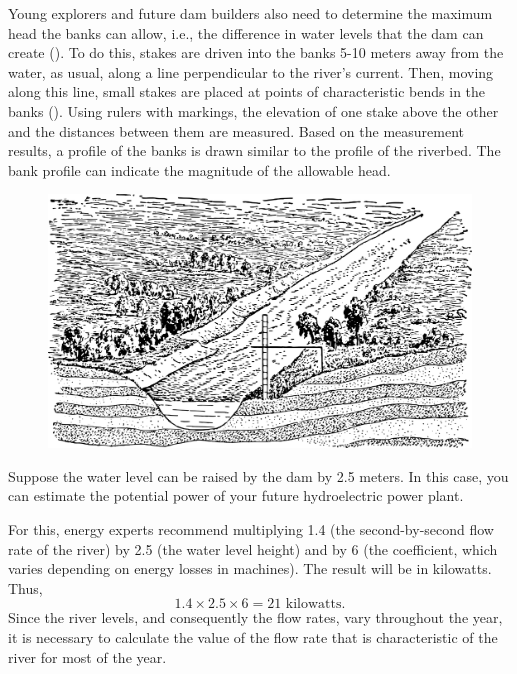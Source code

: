 Young explorers and future dam builders also need to determine the maximum head the banks can allow, i.e., the difference in water levels that the dam can create (). To do this, stakes are driven into the banks 5-10 meters away from the water, as usual, along a line perpendicular to the river's current. Then, moving along this line, small stakes are placed at points of characteristic bends in the banks (). Using rulers with markings, the elevation of one stake above the other and the distances between them are measured. Based on the measurement results, a profile of the banks is drawn similar to the profile of the riverbed. The bank profile can indicate the magnitude of the allowable head.

\begin{figure}[h!]
\centering
\includegraphics[width=\textwidth]{figures/ch-02/fig-044.pdf}
\end{figure}

Suppose the water level can be raised by the dam by 2.5 meters. In this case, you can estimate the potential power of your future hydroelectric power plant.

For this, energy experts recommend multiplying 1.4 (the second-by-second flow rate of the river) by 2.5 (the water level height) and by 6 (the coefficient, which varies depending on energy losses in machines). The result will be in kilowatts. Thus,
\begin{equation*}%
1.4 \times 2.5 \times 6 = 21\,\, \text{kilowatts}.
\end{equation*}
Since the river levels, and consequently the flow rates, vary throughout the year, it is necessary to calculate the value of the flow rate that is characteristic of the river for most of the year.


